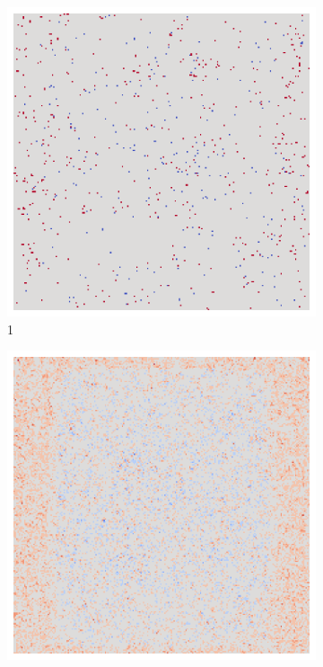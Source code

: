 \begin{figure}[ht!]
\begin{subfigure}{0.095\linewidth}
        \includegraphics[height=1\linewidth]{01-images/05-resultate/uap_resnet/uap0-resnet18-mri-n200-robustificationslevel1.png}
        \caption{1}
    \end{subfigure}\hfill%
    \begin{subfigure}{0.095\linewidth}
        \centering
        \includegraphics[height=1\linewidth]{01-images/05-resultate/uap_resnet/uap0-resnet18-mri-n200-robustificationslevel2.png}

\end{subfigure}
\end{figure}
